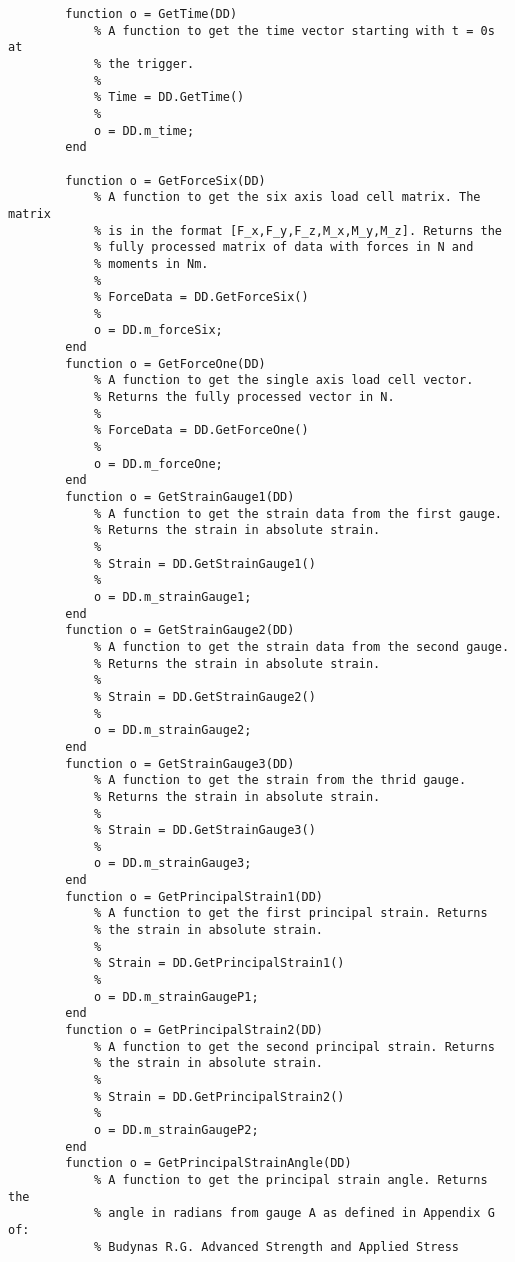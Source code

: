 \begin{lstlisting}
        function o = GetTime(DD)
            % A function to get the time vector starting with t = 0s at
            % the trigger.
            %
            % Time = DD.GetTime()
            %
            o = DD.m_time;
        end
        
        function o = GetForceSix(DD)
            % A function to get the six axis load cell matrix. The matrix
            % is in the format [F_x,F_y,F_z,M_x,M_y,M_z]. Returns the
            % fully processed matrix of data with forces in N and
            % moments in Nm.
            %
            % ForceData = DD.GetForceSix()
            %
            o = DD.m_forceSix;
        end
        function o = GetForceOne(DD)
            % A function to get the single axis load cell vector.
            % Returns the fully processed vector in N.
            %
            % ForceData = DD.GetForceOne()
            %
            o = DD.m_forceOne;
        end
        function o = GetStrainGauge1(DD)
            % A function to get the strain data from the first gauge.
            % Returns the strain in absolute strain.
            %
            % Strain = DD.GetStrainGauge1()
            %
            o = DD.m_strainGauge1;
        end
        function o = GetStrainGauge2(DD)
            % A function to get the strain data from the second gauge.
            % Returns the strain in absolute strain.
            %
            % Strain = DD.GetStrainGauge2()
            %
            o = DD.m_strainGauge2;
        end
        function o = GetStrainGauge3(DD)
            % A function to get the strain from the thrid gauge.
            % Returns the strain in absolute strain.
            %
            % Strain = DD.GetStrainGauge3()
            %
            o = DD.m_strainGauge3;
        end
        function o = GetPrincipalStrain1(DD)
            % A function to get the first principal strain. Returns
            % the strain in absolute strain.
            %
            % Strain = DD.GetPrincipalStrain1()
            %
            o = DD.m_strainGaugeP1;
        end
        function o = GetPrincipalStrain2(DD)
            % A function to get the second principal strain. Returns
            % the strain in absolute strain.
            %
            % Strain = DD.GetPrincipalStrain2()
            %
            o = DD.m_strainGaugeP2;
        end
        function o = GetPrincipalStrainAngle(DD)
            % A function to get the principal strain angle. Returns the
            % angle in radians from gauge A as defined in Appendix G of:
            % Budynas R.G. Advanced Strength and Applied Stress 

\end{lstlisting}
